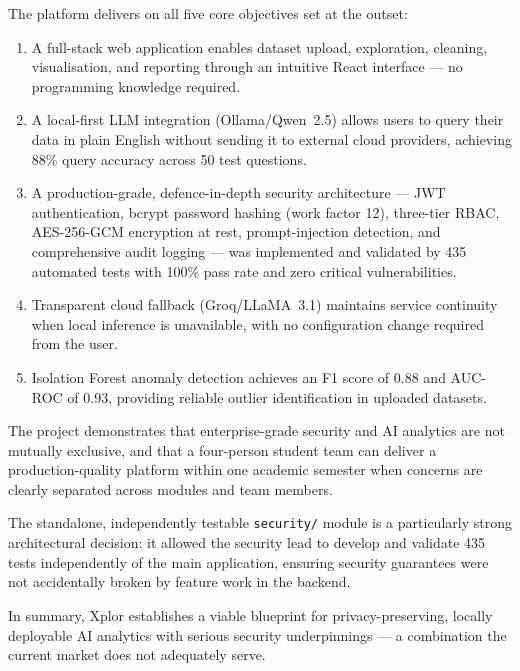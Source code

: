 \documentclass[12pt,a4paper]{report}
\begin{document}
The platform delivers on all five core objectives set at the outset:

\begin{enumerate}[leftmargin=2em]
    \item A full-stack web application enables dataset upload, exploration, cleaning, visualisation, and reporting through an intuitive React interface — no programming knowledge required.
    \item A local-first LLM integration (Ollama/Qwen~2.5) allows users to query their data in plain English without sending it to external cloud providers, achieving 88\% query accuracy across 50 test questions.
    \item A production-grade, defence-in-depth security architecture — JWT authentication, bcrypt password hashing (work factor 12), three-tier RBAC, AES-256-GCM encryption at rest, prompt-injection detection, and comprehensive audit logging — was implemented and validated by 435 automated tests with 100\% pass rate and zero critical vulnerabilities.
    \item Transparent cloud fallback (Groq/LLaMA~3.1) maintains service continuity when local inference is unavailable, with no configuration change required from the user.
    \item Isolation Forest anomaly detection achieves an F1 score of 0.88 and AUC-ROC of 0.93, providing reliable outlier identification in uploaded datasets.
\end{enumerate}

The project demonstrates that enterprise-grade security and AI analytics are not mutually exclusive, and that a four-person student team can deliver a production-quality platform within one academic semester when concerns are clearly separated across modules and team members.

The standalone, independently testable \texttt{security/} module is a particularly strong architectural decision: it allowed the security lead to develop and validate 435 tests independently of the main application, ensuring security guarantees were not accidentally broken by feature work in the backend.

In summary, Xplor establishes a viable blueprint for privacy-preserving, locally deployable AI analytics with serious security underpinnings — a combination the current market does not adequately serve.

\end{document}
